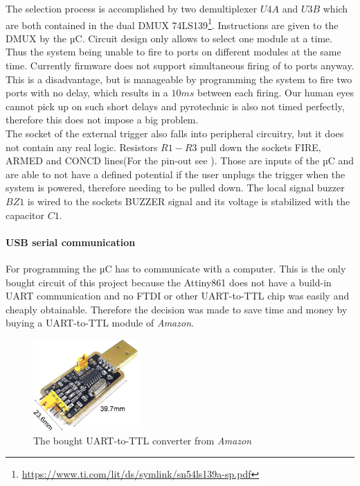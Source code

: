 \noindent The selection process is accomplished by two demultiplexer $U4A$ and $U3B$ which are both contained in the dual DMUX 74LS139\footnote{\url{https://www.ti.com/lit/ds/symlink/sn54ls139a-sp.pdf}}. Instructions are given to the DMUX by the µC. Circuit design only allows to select one module at a time. Thus the system being unable to fire to ports on different modules at the same time. Currently firmware does not support simultaneous firing of to ports anyway. This is a disadvantage, but is manageable by programming the system to fire two ports with no delay, which results in a $10ms$ between each firing. Our human eyes cannot pick up on such short delays and pyrotechnic is also not timed perfectly, therefore this does not impose a big problem.\\

\noindent The socket of the external trigger also falls into peripheral circuitry, but  it does not contain any real logic. Resistors $R1-R3$ pull down the sockets FIRE, ARMED and CONCD lines(For the pin-out see ). Those are inputs of the µC and are able to not have a defined potential if the user unplugs the trigger when the system is powered, therefore needing to be pulled down. The local signal buzzer $BZ1$ is wired to the sockets BUZZER signal and its voltage is stabilized with the capacitor $C1$.\\


\paragraph{USB serial communication}
For programming the µC has to communicate with a computer. This is the only bought circuit of this project because the Attiny861 does not have a build-in UART communication and no FTDI or other UART-to-TTL chip was easily and cheaply obtainable. Therefore the decision was made to save time and money by buying a UART-to-TTL module of \textit{Amazon}. \\

\begin{figure}[!ht]
    \centering
    \includegraphics[width=4cm]{./Figures/uart_ttl.jpg}
    \caption{The bought UART-to-TTL converter from \textit{Amazon}}
    \label{fig:uart_ttl}     
\end{figure}

